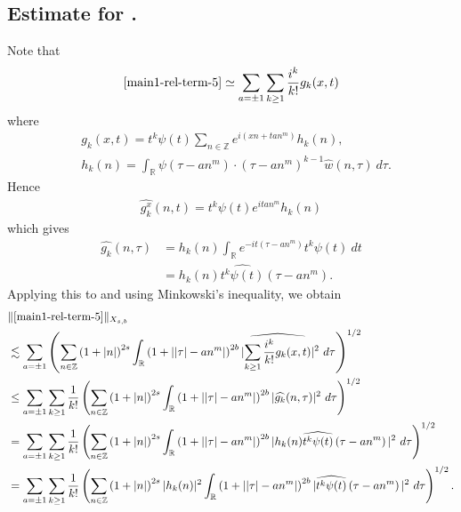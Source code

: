 \documentclass[12pt,reqno]{amsart}
\numberwithin{equation}{section}  %
\renewcommand{\cref}{\Cref}
\newcommand{\rr}{\mathbb{R}}
\newcommand{\zz}{\mathbb{Z}}
\newcommand{\wh}{\widehat}
\begin{document}
\subsection{Estimate for \cref{main1-rel-term-5}.}
Note that
%
%
\begin{equation}
	\label{1n}
	\begin{split}
    \cref{main1-rel-term-5} \simeq \sum_{a = \pm 1}\sum_{k \ge 1}
		\frac{i^k}{k!}g_k(x,t)
	\end{split}
\end{equation}
%
%
where 
%
%
\begin{equation*}
	\begin{split}
		& g_k(x,t) = t^k \psi(t) \sum_{n \in \zz} e^{i\left( xn + ta n^{m}
		\right)} h_k(n),
		\\
		& h_k(n) = \int_\rr \psi \left( \tau - an^{m } \right) \cdot \left(
		\tau - an^{m } \right)^{k -1} \wh{w}(n, \tau) \ d \tau.
	\end{split}
\end{equation*}
%
%
Hence
%
%
\begin{equation*}
	\begin{split}
		\wh{g_k^x}(n, t) = t^{k} \psi(t) e^{i t an^{m }} h_k(n)
	\end{split}
\end{equation*}
%
%
which gives
%
%
\begin{equation*}
	\begin{split}
		\wh{g_k}(n, \tau)
		& = h_k(n) \int_\rr e^{-it\left( \tau - an^{m } \right)}
		t^{k}\psi(t) \ dt
		\\
		& = h_k(n) \wh{t^{k}\psi(t)} \left( \tau - an^{m } \right).
	\end{split}
\end{equation*}
%
%
Applying this to \cref{1n} and using Minkowski's inequality, we obtain
%
%
\begin{equation}
	\label{2n}
	\begin{split}
		& \|\cref{main1-rel-term-5}\|_{X_{s,b}} 
    \\
    & \lesssim \sum_{a = \pm 1} \left( \sum_{n \in \zz} \left (1 + |n| \right )^{2s}
    \int_\rr \left( 1 + | |\tau| - an^{m } | \right)^{2b}
    | \wh{\sum_{k \ge 1} \frac{i^k}{k!}g_k(x,t)} |^2 \ d \tau
		\right)^{1/2}
		\\
		& \le \sum_{a = \pm 1}\sum_{k \ge 1} \frac{1}{k!}\left( \sum_{n \in \zz} \left (1 + |n| \right )^{2s}
    \int_\rr \left( 1 + | |\tau| - an^{m } | \right)^{2b} | \wh{g_k}(n, \tau) |^2 \
		d \tau \right)^{1/2}
		\\
		& = \sum_{a = \pm 1}\sum_{k \ge 1} \frac{1}{k!} \left( \sum_{n \in \zz} \left (1 + |n| \right )^{2s}
    \int_\rr \left( 1 + | |\tau| - an^{m } | \right)^{2b} | h_k(n) \wh{t^k
		\psi(t)} \left( \tau - an^{m } \right) |^2 \ d \tau \right)^{1/2}
		\\
		& = \sum_{a = \pm 1}\sum_{k \ge 1} \frac{1}{k!} \left( \sum_{n \in \zz} \left (1 + |n| \right )^{2s} |
    h_k(n) |^2 \int_\rr \left( 1 + | |\tau| - an^{m } | \right)^{2b} | \wh{t^k
		\psi(t)} \left( \tau - an^{m } \right) |^2 \ d \tau \right)^{1/2}.
	\end{split}
\end{equation}
\end{document}

